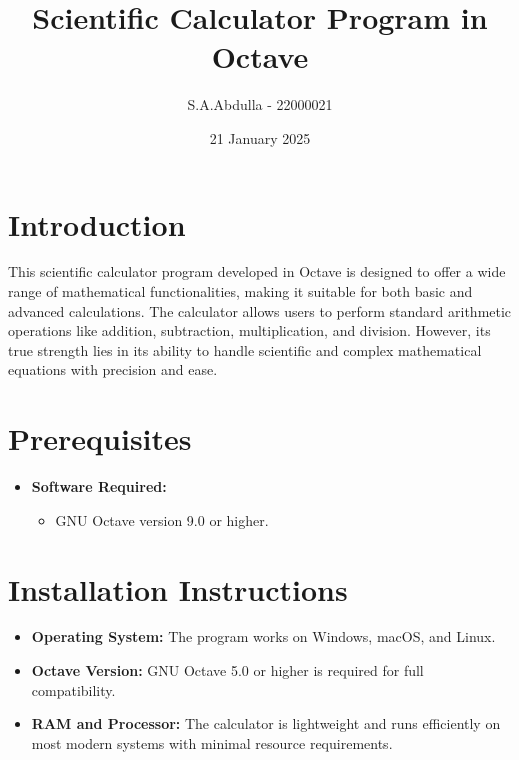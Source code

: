 \documentclass[a4paper,12pt]{article}
\title{Scientific Calculator Program in Octave}
\author{S.A.Abdulla - 22000021}
\date{21 January 2025}
\begin{document}
\maketitle

\newpage
\tableofcontents
\newpage

\newpage
\section*{Introduction}

This scientific calculator program developed in Octave is designed to offer a wide range of mathematical functionalities, making it suitable for both basic and advanced calculations. The calculator allows users to perform standard arithmetic operations like addition, subtraction, multiplication, and division. However, its true strength lies in its ability to handle scientific and complex mathematical equations with precision and ease.

\section*{Prerequisites}

\begin{itemize}
    \item \textbf{Software Required:}
    \begin{itemize}
        \item GNU Octave version 9.0 or higher.
    \end{itemize}
\end{itemize}

\section*{Installation Instructions}

\begin{itemize}
    \item \textbf{Operating System:} The program works on Windows, macOS, and Linux.
    \item \textbf{Octave Version:} GNU Octave 5.0 or higher is required for full compatibility.
    \item \textbf{RAM and Processor:} The calculator is lightweight and runs efficiently on most modern systems with minimal resource requirements.
\end{itemize}
\end{document}

